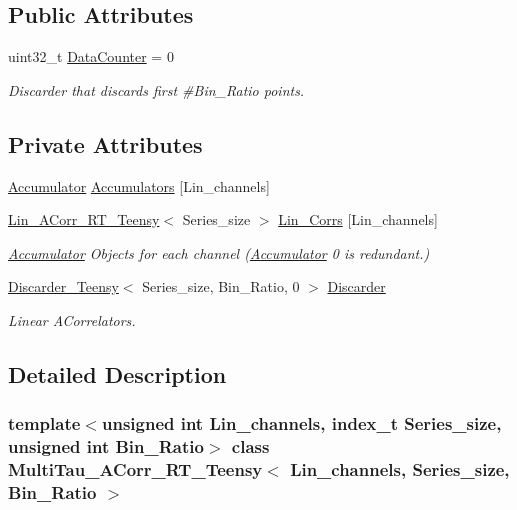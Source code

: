 \subsection*{Public Attributes}
\begin{DoxyCompactItemize}
\item 
uint32\+\_\+t \hyperlink{classMultiTau__ACorr__RT__Teensy_ac403944f1456e09036bef6dc60d5a0b2}{Data\+Counter} = 0
\begin{DoxyCompactList}\small\item\em Discarder that discards first \#\+Bin\+\_\+\+Ratio points. \end{DoxyCompactList}\end{DoxyCompactItemize}
\subsection*{Private Attributes}
\begin{DoxyCompactItemize}
\item 
\hyperlink{classAccumulator}{Accumulator} \hyperlink{classMultiTau__ACorr__RT__Teensy_a5b6f2659e905f143bc898a9b803eae24}{Accumulators} \mbox{[}Lin\+\_\+channels\mbox{]}
\item 
\hyperlink{classLin__ACorr__RT__Teensy}{Lin\+\_\+\+A\+Corr\+\_\+\+R\+T\+\_\+\+Teensy}$<$ Series\+\_\+size $>$ \hyperlink{classMultiTau__ACorr__RT__Teensy_a1dc1e665268e5774e2810b74e6dbebc4}{Lin\+\_\+\+Corrs} \mbox{[}Lin\+\_\+channels\mbox{]}
\begin{DoxyCompactList}\small\item\em \hyperlink{classAccumulator}{Accumulator} Objects for each channel (\hyperlink{classAccumulator}{Accumulator} \textquotesingle{}0\textquotesingle{} is redundant.) \end{DoxyCompactList}\item 
\hyperlink{classDiscarder__Teensy}{Discarder\+\_\+\+Teensy}$<$ Series\+\_\+size, Bin\+\_\+\+Ratio, 0 $>$ \hyperlink{classMultiTau__ACorr__RT__Teensy_ad399a3f451253fd6a1e5156b2207fac8}{Discarder}
\begin{DoxyCompactList}\small\item\em Linear A\+Correlators. \end{DoxyCompactList}\end{DoxyCompactItemize}


\subsection{Detailed Description}
\subsubsection*{template$<$unsigned int Lin\+\_\+channels, index\+\_\+t Series\+\_\+size, unsigned int Bin\+\_\+\+Ratio$>$\newline
class Multi\+Tau\+\_\+\+A\+Corr\+\_\+\+R\+T\+\_\+\+Teensy$<$ Lin\+\_\+channels, Series\+\_\+size, Bin\+\_\+\+Ratio $>$}

